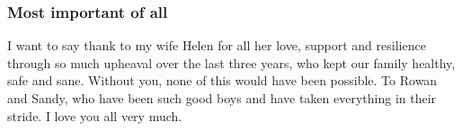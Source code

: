\subsubsection{Most important of all}

I want to say thank to my wife Helen for all her love, support and resilience through so much upheaval over the last three years, who kept our family healthy, safe and sane. Without you, none of this would have been possible. To Rowan and Sandy, who have been such good boys and have taken everything in their stride. I love you all very much. 

\cleardoublepage{}